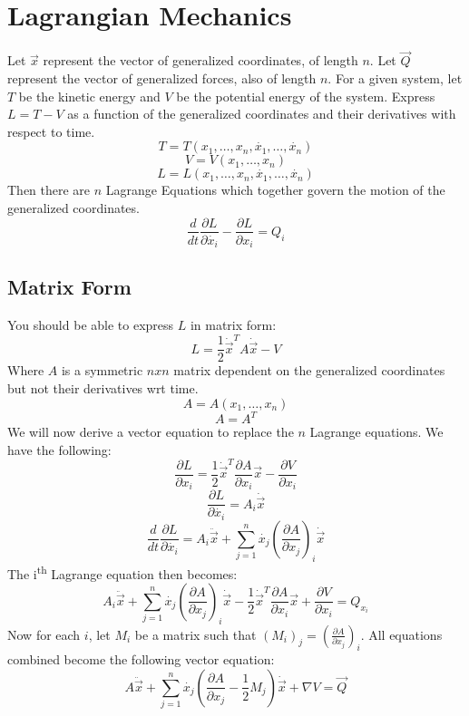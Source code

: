 \documentclass{article}
\begin{document}
\newpage



\section{Lagrangian Mechanics}
Let \(\overrightarrow{x}\) represent the vector of generalized coordinates, of length \(n\).
Let \(\overrightarrow{Q}\) represent the vector of generalized forces, also of length \(n\).
For a given system, let \(T\) be the kinetic energy and \(V\) be the potential energy of the system.
Express \(L = T - V\) as a function of the generalized coordinates and their derivatives with respect to time.
\[
T = T(x_1, \dotsc, x_n, \dot{x_1}, \dotsc, \dot{x_n})
\]\[
V= V(x_1, \dotsc, x_n)
\]\[
L = L(x_1, \dotsc, x_n, \dot{x_1}, \dotsc, \dot{x_n})
\]
Then there are \(n\) Lagrange Equations which together govern the motion of the generalized coordinates.
\[
\frac{d}{dt}\frac{\partial L}{\partial \dot{x_i}} - \frac{\partial L}{\partial x_i} = Q_i
\]

\subsection{Matrix Form}
You should be able to express \(L\) in matrix form:
\[
L = \frac{1}{2} \dot{\overrightarrow{x}}^T A \dot{\overrightarrow{x}} - V
\]
Where \(A\) is a symmetric \(n x n\) matrix dependent on the generalized coordinates but not their derivatives wrt time.
\[
A = A(x_1, \dotsc, x_n)
\]\[
A = A^T
\]
We will now derive a vector equation to replace the \(n\) Lagrange equations. We have the following:
\[
\frac{\partial L}{\partial x_i} = \frac{1}{2}\dot{\overrightarrow{x}}^T \frac{\partial A}{\partial x_i} \overrightarrow{x} - \frac{\partial V}{\partial x_i}
\]\[
\frac{\partial L}{\partial \dot{x_i}} = A_i \dot{\overrightarrow{x}}
\]\[
\frac{d}{dt}\frac{\partial L}{\partial \dot{x_i}} = A_i \ddot{\overrightarrow{x}} +
\sum_{j=1}^{n} \dot{x_j}(\frac{\partial A}{\partial x_j})_i \dot{\overrightarrow{x}}
\]
The i\textsuperscript{th} Lagrange equation then becomes:
\[
A_i \ddot{\overrightarrow{x}} + \sum_{j=1}^{n} \dot{x_j}(\frac{\partial A}{\partial x_j})_i \dot{\overrightarrow{x}}
- \frac{1}{2}\dot{\overrightarrow{x}}^T \frac{\partial A}{\partial x_i} \overrightarrow{x} + \frac{\partial V}{\partial x_i}
= Q_{x_i}
\]
Now for each \(i\), let \(M_i\) be a matrix such that \( (M_i)_j = (\frac{\partial A}{\partial x_j})_i\).
All equations combined become the following vector equation:
\[
A \ddot{\overrightarrow{x}} + \sum_{j=1}^{n} \dot{x_j}(\frac{\partial A}{\partial x_j} - \frac{1}{2}M_j) \dot{\overrightarrow{x}}  + \nabla V = \overrightarrow{Q}
\]
\end{document}
